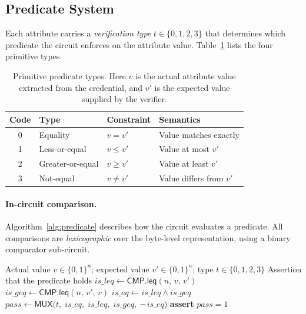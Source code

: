 \subsection{Predicate System}\label{sec:predicates}

Each attribute carries a \emph{verification type} $t \in \{0,1,2,3\}$ that determines which predicate the circuit enforces on the attribute value.  Table~\ref{tab:predicates} lists the four primitive types.

\begin{table}[t]
  \centering
  \caption{Primitive predicate types.  Here $v$ is the actual attribute value extracted from the credential, and $v'$ is the expected value supplied by the verifier.}\label{tab:predicates}
  \begin{tabular}{clll}
    \toprule
    Code & Type & Constraint & Semantics \\
    \midrule
    0 & Equality      & $v = v'$    & Value matches exactly \\
    1 & Less-or-equal & $v \leq v'$ & Value at most $v'$ \\
    2 & Greater-or-equal & $v \geq v'$ & Value at least $v'$ \\
    3 & Not-equal     & $v \neq v'$ & Value differs from $v'$ \\
    \bottomrule
  \end{tabular}
\end{table}

\paragraph{In-circuit comparison.}
Algorithm~\ref{alg:predicate} describes how the circuit evaluates a predicate.  All comparisons are \emph{lexicographic} over the byte-level representation, using a binary comparator sub-circuit.

\begin{algorithm}[t]
  \caption{$\mathsf{EvalPredicate}$: in-circuit predicate evaluation}\label{alg:predicate}
  \begin{algorithmic}[1]
    \Require Actual value $v \in \{0,1\}^n$; expected value $v' \in \{0,1\}^n$; type $t \in \{0,1,2,3\}$
    \Ensure Assertion that the predicate holds
    \Statex
    \State $\mathit{is\_leq} \gets \mathsf{CMP.leq}(n,\, v,\, v')$
    \State $\mathit{is\_geq} \gets \mathsf{CMP.leq}(n,\, v',\, v)$
    \State $\mathit{is\_eq} \gets \mathit{is\_leq} \wedge \mathit{is\_geq}$
    \State $\mathit{pass} \gets \mathsf{MUX}\bigl(t,\; \mathit{is\_eq},\; \mathit{is\_leq},\; \mathit{is\_geq},\; \neg\,\mathit{is\_eq}\bigr)$
    \State \textbf{assert} $\mathit{pass} = 1$
  \end{algorithmic}
\end{algorithm}

